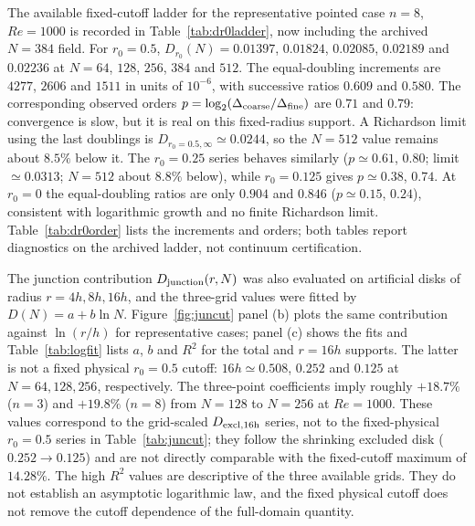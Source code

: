 \documentclass[11pt]{article}
\newcommand{\tabbox}[1]{\resizebox{\ifdim\width>\textwidth\textwidth\else\width\fi}{!}{#1}}
\begin{document}
\begin{table}[H]
\centering
\caption{Thirty-case refinement difference $D_{256}/D_{128}-1$ with a fixed
physical wall cutoff $r_0$.}
\label{tab:juncut}
\tabbox{}
\end{table}
\par


The available fixed-cutoff ladder for the representative pointed case
$n=8$, $Re=1000$ is recorded in Table~\ref{tab:dr0ladder}, now including the
archived $N=384$ field. For $r_0=0.5$, $D_{r_0}(N)=0.01397$, $0.01824$,
$0.02085$, $0.02189$ and $0.02236$ at $N=64$, $128$, $256$, $384$ and $512$.
The equal-doubling increments are $4277$, $2606$ and $1511$ in units of
$10^{-6}$, with successive ratios $0.609$ and $0.580$. The corresponding
observed orders $p=\log_2(\Delta_{\rm coarse}/\Delta_{\rm fine})$ are $0.71$
and $0.79$: convergence is slow, but it is real on this fixed-radius support.
A Richardson limit using the last doublings is $D_{r_0=0.5,\infty}\simeq
0.0244$, so the $N=512$ value remains about $8.5\%$ below it. The $r_0=0.25$
series behaves similarly ($p\simeq0.61$, $0.80$; limit $\simeq0.0313$;
$N=512$ about $8.8\%$ below), while $r_0=0.125$ gives $p\simeq0.38$, $0.74$.
At $r_0=0$ the equal-doubling ratios are only $0.904$ and $0.846$
($p\simeq0.15$, $0.24$), consistent with logarithmic growth and no finite
Richardson limit. Table~\ref{tab:dr0order} lists the increments and orders;
both tables report diagnostics on the archived ladder, not continuum
certification.

The junction contribution $D_{\rm junction}(r,N)$ was also evaluated on
artificial disks of radius $r=4h,8h,16h$, and the three-grid values were
fitted by $D(N)=a+b\ln N$. Figure~\ref{fig:juncut} panel (b) plots the same
contribution against $\ln(r/h)$ for representative cases; panel (c) shows the
fits and Table~\ref{tab:logfit} lists $a$, $b$ and $R^2$ for the total and
$r=16h$ supports. The latter is not a fixed physical $r_0=0.5$ cutoff:
$16h\simeq0.508$, $0.252$ and $0.125$ at $N=64,128,256$, respectively. The
three-point coefficients imply roughly $+18.7\%$ ($n=3$) and $+19.8\%$ ($n=8$)
from $N=128$ to $N=256$ at $Re=1000$. These values correspond to the
grid-scaled $D_{\rm excl,16h}$ series, not to the fixed-physical $r_0=0.5$
series in Table~\ref{tab:juncut}; they follow the shrinking excluded disk
($0.252\to0.125$) and are not directly comparable with the fixed-cutoff maximum
of $14.28\%$. The high $R^2$ values are
descriptive of the three available grids. They do not establish an asymptotic
logarithmic law, and the fixed physical cutoff does not remove the cutoff
dependence of the full-domain quantity.
\end{document}
